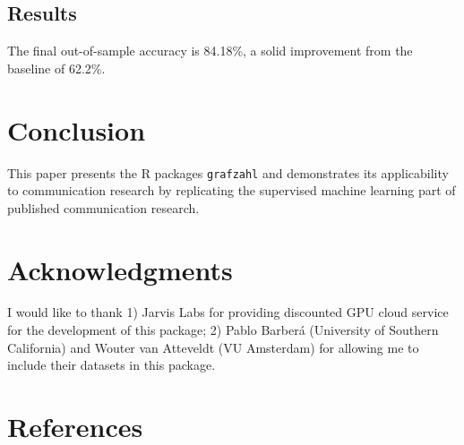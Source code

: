 \documentclass[
]{ccr}
\begin{document}
\hypertarget{results}{%
\subsection{Results}\label{results}}

The final out-of-sample accuracy is 84.18\%, a solid improvement from
the baseline of 62.2\%.

\hypertarget{conclusion}{%
\section{Conclusion}\label{conclusion}}

This paper presents the R packages \texttt{grafzahl} and demonstrates
its applicability to communication research by replicating the
supervised machine learning part of published communication research.

\hypertarget{acknowledgments}{%
\section{Acknowledgments}\label{acknowledgments}}

I would like to thank 1) Jarvis Labs for providing discounted GPU cloud
service for the development of this package; 2) Pablo Barberá
(University of Southern California) and Wouter van Atteveldt (VU
Amsterdam) for allowing me to include their datasets in this package.

\hypertarget{references}{%
\section*{References}\label{references}}
\end{document}
